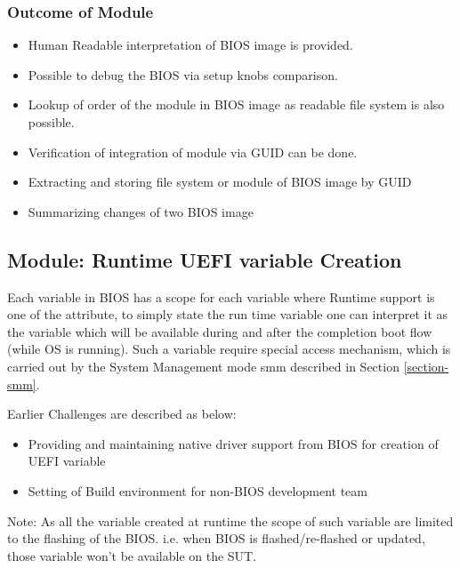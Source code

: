 \subsubsection{Outcome of Module}
\begin{itemize}
	\item Human Readable interpretation of BIOS image is provided.
	\item Possible to debug the BIOS via setup knobs comparison.
	\item Lookup of order of the module in BIOS image as readable file system is also possible.
	\item Verification of integration of module via GUID can be done.
	\item Extracting and storing file system or module of BIOS image by GUID
	\item Summarizing changes of two BIOS image
\end{itemize}



\subsection{Module: Runtime UEFI variable Creation}\label{module-runtime-uefi-variable-creation}
Each variable in BIOS has a scope for each variable where Runtime support is one of the attribute, to simply state the run time variable one can interpret it as the variable which will be available during and after the completion boot flow (while OS is running). Such a variable require special access mechanism, which is carried out by the System Management mode \gls{smm} described in Section \ref{section-smm}.

Earlier Challenges are described as below:
\begin{itemize}
	\item Providing and maintaining native driver support from BIOS for creation of UEFI variable
	\item Setting of Build environment for non-BIOS development team
\end{itemize}

Note: As all the variable created at runtime the scope of such variable are limited to the flashing of the BIOS. i.e. when BIOS is flashed/re-flashed or updated, those variable won't be available on the SUT.

